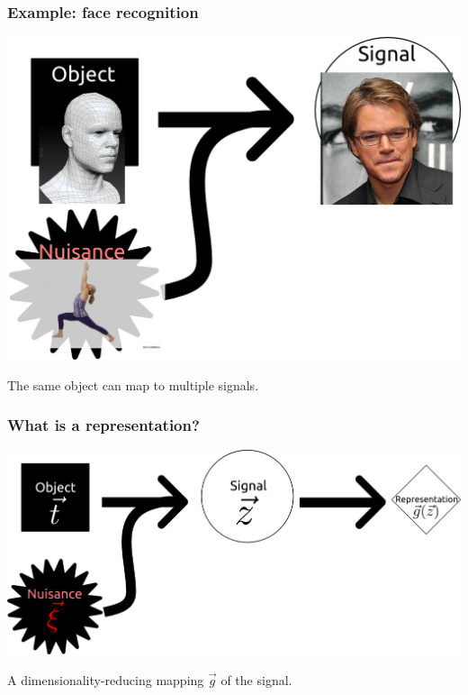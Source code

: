 \documentclass{beamer}
\begin{document}
\begin{frame}
\frametitle{Example: face recognition}
\begin{center}
\includegraphics[scale = 0.2]{defense_diagrams/face_2b.png}
\end{center}
The same object can map to multiple signals.
\end{frame}

\begin{frame}
\frametitle{What is a representation?}
\begin{center}
\includegraphics[scale = 0.2]{defense_diagrams/representation1.png}
\end{center}
A dimensionality-reducing mapping $\vec{g}$ of the signal.
\end{frame}
\end{document}
